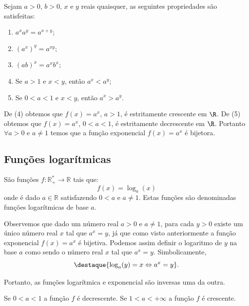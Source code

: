  Sejam $a > 0$, $b > 0$, $x$ e $y$ reais quaisquer, as seguintes propriedades são satisfeitas:
 \begin{enumerate}
  \item $a^x a^y= a^{x+y}$;
  \item $(a^x)^y= a^{xy}$;
  \item $(ab)^x= a^x b^x$;
  \item Se $a > 1$ e $x < y$, então $a^x < a^y$;
  \item Se $0 < a < 1$ e $x < y$, então $a^x > a^y$.
 \end{enumerate}

 De (4) obtemos que $f(x)= a^x$, $a > 1$, é estritamente crescente em $\R$. De (5) obtemos que $f(x)= a^x$, $0 < a < 1$, é estritamente decrescente em $\R$. Portanto $\forall a > 0$ e $a \neq 1$ temos que a função exponencial $f(x)= a^x$ é bijetora.


 \subsection{Funções logarítmicas}

 São funções $f: \mathbb{R_{+}^{*}} \rightarrow \mathbb{R} $ tais que:
 \[f(x) = \log_{a}(x)\]
 onde é dado $a \in \mathbb{R}$ satisfazendo $0 < a$ e $a \neq 1$. Estas funções são denominadas funções logarítmicas de base $a$.

 Observemos que dado um número real $a> 0$ e $a \neq 1$, para cada $y>0$ existe um único número real $x$ tal que $a^x= y$, já que como visto anteriormente a função exponencial $f(x)= a^x$ é bijetiva. Podemos assim definir o logaritmo de $y$ na base $a$ como sendo o número real $x$ tal que $a^x= y$. Simbolicamente,
 \[\destaque{\log_a(y)= x  \Leftrightarrow a^x= y}.\]

 Portanto, as funções logarítmica e exponencial são inversas uma da outra.

 Se $0 < a < 1$ a função $f$ é decrescente. Se $1 < a < +\infty$ a função $f$ é crescente.

